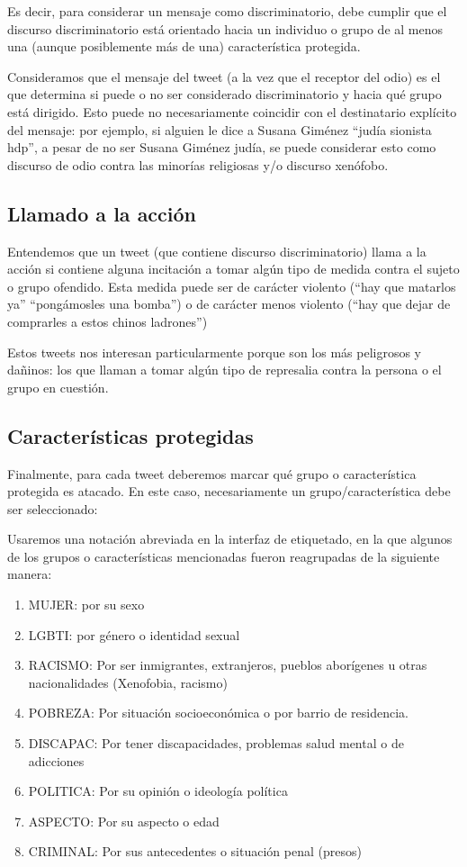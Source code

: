 Es decir, para considerar un mensaje como discriminatorio, debe cumplir que el discurso discriminatorio está orientado hacia un individuo o grupo de al menos una (aunque posiblemente más de una) característica protegida.


Consideramos que el mensaje del tweet (a la vez que el receptor del odio) es el que determina si puede o no ser considerado discriminatorio y hacia qué grupo está dirigido. Esto puede no necesariamente coincidir con el destinatario explícito del mensaje: por ejemplo, si alguien le dice a Susana Giménez ``judía sionista hdp'', a pesar de no ser Susana Giménez judía, se puede considerar esto como discurso de odio contra las minorías religiosas y/o discurso xenófobo.


\subsection{Llamado a la acción}

Entendemos que un tweet (que contiene discurso discriminatorio) llama a la acción si contiene alguna incitación a tomar algún tipo de medida contra el sujeto o grupo ofendido. Esta medida puede ser de carácter violento (``hay que matarlos ya'' ``pongámosles una bomba'') o de carácter menos violento (``hay que dejar de comprarles a estos chinos ladrones'')

Estos tweets nos interesan particularmente porque son los más peligrosos y dañinos: los que llaman a tomar algún tipo de represalia contra la persona o el grupo en cuestión.

\subsection{Características protegidas}

Finalmente, para cada tweet deberemos marcar qué grupo o característica protegida es atacado. En este caso, necesariamente un grupo/característica debe ser seleccionado:

Usaremos una notación abreviada en la interfaz de etiquetado, en la que algunos de los grupos o características mencionadas fueron reagrupadas de la siguiente manera:

\begin{enumerate}
    \item MUJER: por su sexo
    \item LGBTI: por género o identidad sexual
    \item RACISMO: Por ser inmigrantes, extranjeros, pueblos aborígenes u otras nacionalidades (Xenofobia, racismo)
    \item POBREZA: Por situación socioeconómica o por barrio de residencia.
    \item DISCAPAC: Por tener discapacidades, problemas salud mental o de adicciones
    \item POLITICA: Por su opinión o ideología política
    \item ASPECTO: Por su aspecto o edad
    \item CRIMINAL: Por sus antecedentes o situación penal (presos)
\end{enumerate}

